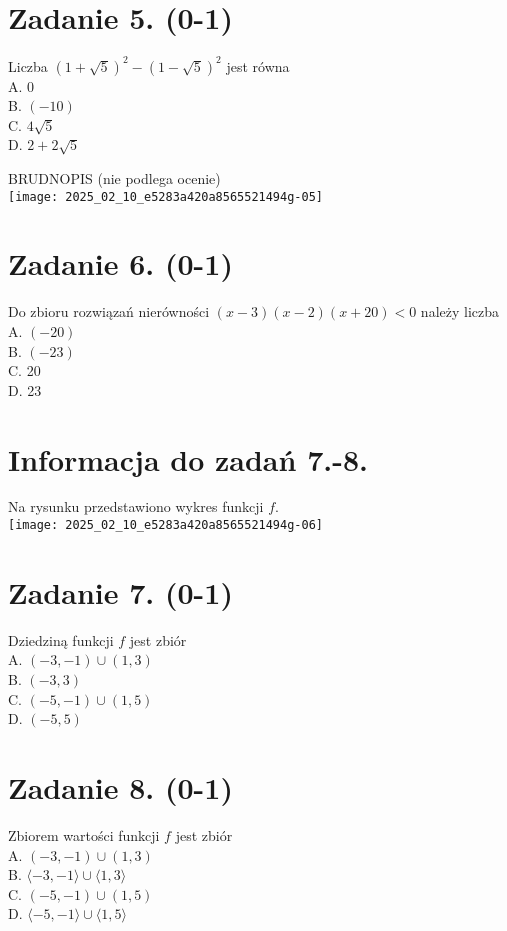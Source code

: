 \documentclass[10pt]{article}
\begin{document}
\section*{Zadanie 5. (0-1)}
Liczba \((1+\sqrt{5})^{2}-(1-\sqrt{5})^{2}\) jest równa\\
A. 0\\
B. \((-10)\)\\
C. \(4 \sqrt{5}\)\\
D. \(2+2 \sqrt{5}\)

BRUDNOPIS (nie podlega ocenie)\\
\texttt{[image: 2025\_02\_10\_e5283a420a8565521494g-05]}

\section*{Zadanie 6. (0-1)}
Do zbioru rozwiązań nierówności \((x-3)(x-2)(x+20)<0\) należy liczba\\
A. \((-20)\)\\
B. \((-23)\)\\
C. 20\\
D. 23

\section*{Informacja do zadań 7.-8.}
Na rysunku przedstawiono wykres funkcji \(f\).\\
\texttt{[image: 2025\_02\_10\_e5283a420a8565521494g-06]}

\section*{Zadanie 7. (0-1)}
Dziedziną funkcji \(f\) jest zbiór\\
A. \((-3,-1) \cup(1,3)\)\\
B. \((-3,3)\)\\
C. \((-5,-1) \cup(1,5)\)\\
D. \((-5,5)\)

\section*{Zadanie 8. (0-1)}
Zbiorem wartości funkcji \(f\) jest zbiór\\
A. \((-3,-1) \cup(1,3)\)\\
B. \(\langle-3,-1\rangle \cup\langle 1,3\rangle\)\\
C. \((-5,-1) \cup(1,5)\)\\
D. \(\langle-5,-1\rangle \cup\langle 1,5\rangle\)
\end{document}
